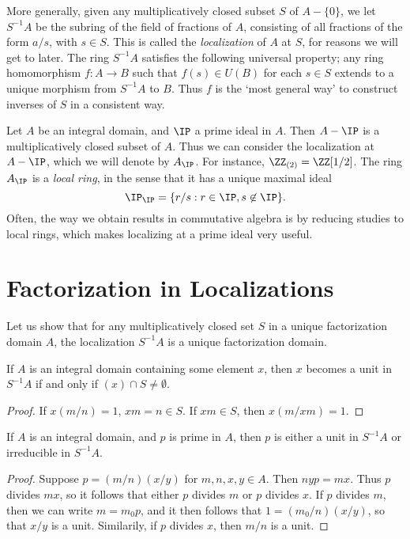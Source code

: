 More generally, given any multiplicatively closed subset $S$ of $A - \{ 0 \}$, we let $S^{-1}A$ be the subring of the field of fractions of $A$, consisting of all fractions of the form $a/s$, with $s \in S$. This is called the \emph{localization} of $A$ at $S$, for reasons we will get to later. The ring $S^{-1}A$ satisfies the following universal property; any ring homomorphism $f: A \to B$ such that $f(s) \in U(B)$ for each $s \in S$ extends to a unique morphism from $S^{-1}A$ to $B$. Thus $f$ is the `most general way' to construct inverses of $S$ in a consistent way.

\begin{example}
    Let $A$ be an integral domain, and $\IP$ a prime ideal in $A$. Then $A - \IP$ is a multiplicatively closed subset of $A$. Thus we can consider the localization at $A - \IP$, which we will denote by $A_{\IP}$. For instance, $\ZZ_{(2)} = \ZZ[1/2]$. The ring  $A_{\IP}$ is a \emph{local ring}, in the sense that it has a unique maximal ideal
    \[ \IP_{\IP} = \{ r/s : r \in \IP, s \not \in \IP \}. \]
    Often, the way we obtain results in commutative algebra is by reducing studies to local rings, which makes localizing at a prime ideal  very useful.
\end{example}

\section{Factorization in Localizations}

Let us show that for any multiplicatively closed set $S$ in a unique factorization domain $A$, the localization $S^{-1}A$ is a unique factorization domain.

\begin{lemma}
    If $A$ is an integral domain containing some element $x$, then $x$ becomes a unit in $S^{-1}A$ if and only if $(x) \cap S \neq \emptyset$.
\end{lemma}
\begin{proof}
    If $x (m/n) = 1$, $xm = n \in S$. If $xm \in S$, then $x (m/xm) = 1$.
\end{proof}

\begin{lemma}
    If $A$ is an integral domain, and $p$ is prime in $A$, then $p$ is either a unit in $S^{-1}A$ or irreducible in $S^{-1}A$.
\end{lemma}
\begin{proof}
    Suppose $p = (m/n)(x/y)$ for $m,n,x,y \in A$. Then $nyp = mx$. Thus $p$ divides $mx$, so it follows that either $p$ divides $m$ or $p$ divides $x$. If $p$ divides $m$, then we can write $m = m_0p$, and it then follows that $1 = (m_0/n)(x/y)$, so that $x/y$ is a unit. Similarily, if $p$ divides $x$, then $m/n$ is a unit.
\end{proof}

